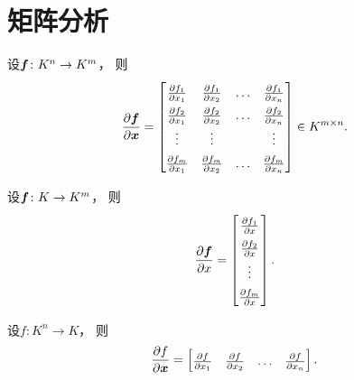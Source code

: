 \section{矩阵分析}
\begin{proposition}
设\(\boldsymbol{f}\colon K^n \to K^m\)，
则\begin{equation*}
	\def\arraystretch{1.5}
	\pdv{\vb{f}}{\vb{x}}
	= \begin{bmatrix}
		\pdv{f_1}{x_1}
		& \pdv{f_1}{x_2}
		& \dots
		& \pdv{f_1}{x_n} \\
		\pdv{f_2}{x_1}
		& \pdv{f_2}{x_2}
		& \dots
		& \pdv{f_2}{x_n} \\
		\vdots & \vdots && \vdots \\
		\pdv{f_m}{x_1}
		& \pdv{f_m}{x_2}
		& \dots
		& \pdv{f_m}{x_n} \\
	\end{bmatrix}
	\in K^{m \times n}.
\end{equation*}
\end{proposition}

\begin{corollary}
设\(\boldsymbol{f}\colon K \to K^m\)，
则\begin{equation*}
	\def\arraystretch{1.5}
	\pdv{\vb{f}}{x}
	= \begin{bmatrix}
		\pdv{f_1}{x} \\
		\pdv{f_2}{x} \\
		\vdots \\
		\pdv{f_m}{x} \\
	\end{bmatrix}.
\end{equation*}
\end{corollary}

\begin{corollary}
设\(f\colon K^n \to K\)，
则\begin{equation*}
	\pdv{f}{\vb{x}}
	= \begin{bmatrix}
		\pdv{f}{x_1}
		& \pdv{f}{x_2}
		& \dots
		& \pdv{f}{x_n} \\
	\end{bmatrix}.
\end{equation*}
\end{corollary}

